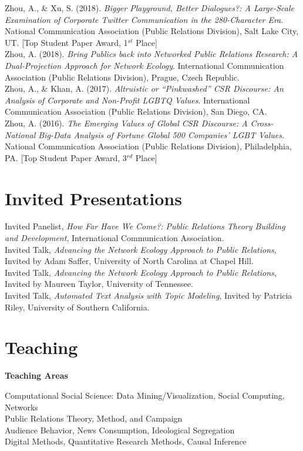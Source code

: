 \documentclass[12pt, letterpaper]{article}
\newcommand{\years}[1]{\marginnote{\normalsize #1}}
\begin{document}
{  \years{[4]} Zhou, A., \& Xu, S. (2018). \textit{Bigger Playground, Better Dialogues?: A Large-Scale Examination of Corporate Twitter Communication in the 280-Character Era}. National Communication Association (Public Relations Division), Salt Lake City, UT. [Top Student Paper Award, 1$^{st}$ Place]\\
  \years{[3]} Zhou, A. (2018). \textit{Bring Publics back into Networked Public Relations Research: A Dual-Projection Approach for Network Ecology}. International Communication Association (Public Relations Division), Prague, Czech Republic.\\
  \years{[2]} Zhou, A., \& Khan, A. (2017). \textit{Altruistic or ``Pinkwashed'' CSR Discourse: An Analysis of Corporate and Non-Profit LGBTQ Values}. International Communication Association (Public Relations Division), San Diego, CA.\\
  \years{[1]} Zhou, A. (2016). \textit{The Emerging Values of Global CSR Discourse: A Cross-National Big-Data Analysis of Fortune Global 500 Companies' LGBT Values}. National Communication Association (Public Relations Division), Philadelphia, PA. [Top Student Paper Award, 3$^{rd}$ Place]

\section*{Invited Presentations}

  \years{2019} Invited Panelist, \textit{How Far Have We Come?: Public Relations Theory Building and Development}, International Communication Association.\\
  \years{2019} Invited Talk, \textit{Advancing the Network Ecology Approach to Public Relations}, Invited by Adam Saffer, University of North Carolina at Chapel Hill.\\
  \years{2019} Invited Talk, \textit{Advancing the Network Ecology Approach to Public Relations}, Invited by Maureen Taylor, University of Tennessee.\\
  \years{2016} Invited Talk, \textit{Automated Text Analysis with Topic Modeling}, Invited by Patricia Riley, University of Southern California.

\section*{Teaching}

\textbf{Teaching Areas}

  \years{-} Computational Social Science: Data Mining/Visualization, Social Computing, Networks\\
  \years{-} Public Relations Theory, Method, and Campaign\\
  \years{-} Audience Behavior, News Consumption, Ideological Segregation\\
  \years{-} Digital Methods, Quantitative Research Methods, Causal Inference\\

}
\end{document}
